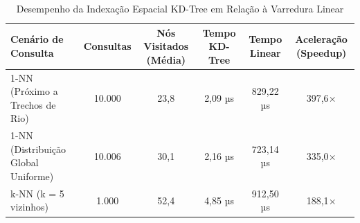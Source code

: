 \begin{table}[htbp]
\centering
\footnotesize
\caption{Desempenho da Indexação Espacial KD-Tree em Relação à Varredura Linear}
\label{tab:kdtree_perf}
\begin{tabular}{lccccc}
\toprule
Cenário de Consulta & Consultas & Nós Visitados (Média) & Tempo KD-Tree & Tempo Linear & Aceleração (Speedup) \\
\midrule
1-NN (Próximo a Trechos de Rio) & 10.000 & 23,8 & 2,09 µs & 829,22 µs & 397,6$\times$ \\
1-NN (Distribuição Global Uniforme) & 10.006 & 30,1 & 2,16 µs & 723,14 µs & 335,0$\times$ \\
k-NN (k = 5 vizinhos) & 1.000 & 52,4 & 4,85 µs & 912,50 µs & 188,1$\times$ \\
\bottomrule
\end{tabular}
\end{table}